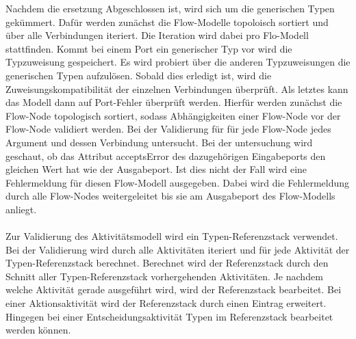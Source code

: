     Nachdem die ersetzung Abgeschlossen ist, wird sich um die generischen Typen gekümmert. 
    Dafür werden zunächst die Flow-Modelle topoloisch sortiert und über alle Verbindungen iteriert.
    Die Iteration wird dabei pro Flo-Modell stattfinden.
    Kommt bei einem Port ein generischer Typ vor wird die Typzuweisung gespeichert. 
    Es wird probiert über die anderen Typzuweisungen die generischen Typen aufzulösen. 
    Sobald dies erledigt ist, wird die Zuweisungskompatibilität der einzelnen Verbindungen überprüft. 
    Als letztes kann das Modell dann auf Port-Fehler überprüft werden. 
    Hierfür werden zunächst die Flow-Node topologisch sortiert, sodass Abhängigkeiten einer Flow-Node vor der Flow-Node validiert werden. 
    Bei der Validierung für für jede Flow-Node jedes Argument und dessen Verbindung untersucht. 
    Bei der untersuchung wird geschaut, ob das Attribut acceptsError des dazugehörigen Eingabeports den gleichen Wert hat wie der Ausgabeport. 
    Ist dies nicht der Fall wird eine Fehlermeldung für diesen Flow-Modell ausgegeben. 
    Dabei wird die Fehlermeldung durch alle Flow-Nodes weitergeleitet bis sie am Ausgabeport des Flow-Modells anliegt.\\
    \\
    Zur Validierung des Aktivitätsmodell wird ein Typen-Referenzstack verwendet.
    Bei der Validierung wird durch alle Aktivitäten iteriert und für jede Aktivität der Typen-Referenzstack berechnet.
    Berechnet wird der Referenzstack durch den Schnitt aller Typen-Referenzstack vorhergehenden Aktivitäten.
    Je nachdem welche Aktivität gerade ausgeführt wird, wird der Referenzstack bearbeitet.
    Bei einer Aktionsaktivität wird der Referenzstack durch einen Eintrag erweitert.
    Hingegen bei einer Entscheidungsaktivität Typen im Referenzstack bearbeitet werden können.
